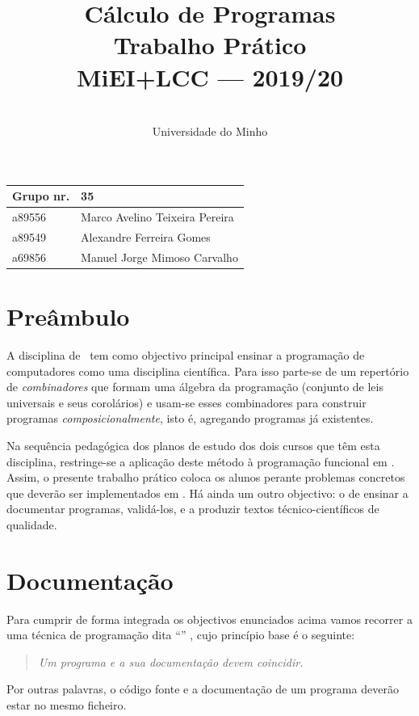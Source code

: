 \documentclass[a4paper]{article}
\title{
       	    Cálculo de Programas
\\
       	Trabalho Prático
\\
       	MiEI+LCC --- 2019/20
}
\author{
       	\dium
\\
       	Universidade do Minho
}
\date\mydate
\begin{document}
\maketitle

\begin{center}\large
\begin{tabular}{ll}
\textbf{Grupo} nr. & 35
\\\hline
a89556 & Marco Avelino Teixeira Pereira	
\\
a89549 & Alexandre Ferreira Gomes
\\
a69856 & Manuel Jorge Mimoso Carvalho	
\end{tabular}
\end{center}

\section{Preâmbulo}

A disciplina de \CP\ tem como objectivo principal ensinar
a progra\-mação de computadores como uma disciplina científica. Para isso
parte-se de um repertório de \emph{combinadores} que formam uma álgebra da
programação (conjunto de leis universais e seus corolários) e usam-se esses
combinadores para construir programas \emph{composicionalmente}, isto é,
agregando programas já existentes.
  
Na sequência pedagógica dos planos de estudo dos dois cursos que têm
esta disciplina, restringe-se a aplicação deste método à programação
funcional em \Haskell. Assim, o presente trabalho prático coloca os
alunos perante problemas concretos que deverão ser implementados em
\Haskell.  Há ainda um outro objectivo: o de ensinar a documentar
programas, validá-los, e a produzir textos técnico-científicos de
qualidade.

\section{Documentação} Para cumprir de forma integrada os objectivos
enunciados acima vamos recorrer a uma técnica de programa\-ção dita
``'' \cite{Kn92}, cujo princípio base é o seguinte:
\begin{quote}\em Um programa e a sua documentação devem coincidir.
\end{quote} Por outras palavras, o código fonte e a documentação de um
programa deverão estar no mesmo ficheiro.
\end{document}
